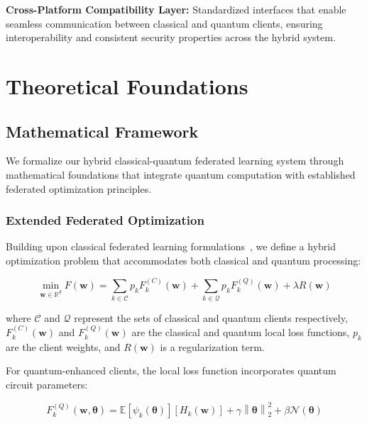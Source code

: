 \documentclass[10pt,journal,compsoc]{IEEEtran}
\newcommand{\vect}[1]{\mathbf{#1}}
\newcommand{\field}[1]{\mathbb{#1}}
\newcommand{\norm}[1]{\left\|#1\right\|}
\newcommand{\expect}[1]{\mathbb{E}\left[#1\right]}
\begin{document}
\textbf{Cross-Platform Compatibility Layer:} Standardized interfaces that enable seamless communication between classical and quantum clients, ensuring interoperability and consistent security properties across the hybrid system.

\section{Theoretical Foundations}

\subsection{Mathematical Framework}

We formalize our hybrid classical-quantum federated learning system through mathematical foundations that integrate quantum computation with established federated optimization principles.

\subsubsection{Extended Federated Optimization}

Building upon classical federated learning formulations~\cite{McMahan2017}, we define a hybrid optimization problem that accommodates both classical and quantum processing:

\begin{equation}
\min_{\vect{w} \in \field{R}^d} F(\vect{w}) = \sum_{k \in \mathcal{C}} p_k F_k^{(C)}(\vect{w}) + \sum_{k \in \mathcal{Q}} p_k F_k^{(Q)}(\vect{w}) + \lambda R(\vect{w})
\label{eq:hybrid_objective}
\end{equation}

where $\mathcal{C}$ and $\mathcal{Q}$ represent the sets of classical and quantum clients respectively, $F_k^{(C)}(\vect{w})$ and $F_k^{(Q)}(\vect{w})$ are the classical and quantum local loss functions, $p_k$ are the client weights, and $R(\vect{w})$ is a regularization term.

For quantum-enhanced clients, the local loss function incorporates quantum circuit parameters:

\begin{equation}
F_k^{(Q)}(\vect{w}, \boldsymbol{\theta}) = \expect{\psi_k(\boldsymbol{\theta})}\left[ H_k(\vect{w}) \right] + \gamma \norm{\boldsymbol{\theta}}_2^2 + \beta \mathcal{N}(\boldsymbol{\theta})
\label{eq:quantum_loss}
\end{equation}
\end{document}
